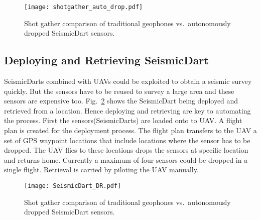 \begin{figure} \centering
  {\texttt{[image: shotgather\_auto\_drop.pdf]}}
 \caption{Shot gather comparison of traditional geophones vs.\ autonomously dropped SeismicDart sensors. 
 \label{fig:shotgather_auto_drop}}
\end{figure}
\subsection{Deploying and Retrieving SeismicDart}
SeismicDarts combined with UAVs could be exploited to obtain a seismic survey quickly. But the sensors have to be reused to survey a large area and these sensors are expensive too. Fig.~\ref{fig:SeismicDart_DR} shows the SeismicDart being deployed and retrieved from a location. Hence deploying and retrieving are key to automating the process. First the sensors(SeismicDarts) are loaded onto to UAV. A flight plan is created for the deployment process. The flight plan transfers to the UAV a set of GPS waypoint locations that include locations where the sensor has to be dropped. The UAV flies to these locations drops the sensors at specific location and returns home. Currently a maximum of four sensors could be dropped in a single flight. Retrieval is carried by  piloting the UAV manually.
\begin{figure} \centering
  {\texttt{[image: SeismicDart\_DR.pdf]}}
 \caption{Shot gather comparison of traditional geophones vs.\ autonomously dropped SeismicDart sensors. 
 \label{fig:SeismicDart_DR}}
\end{figure}
 